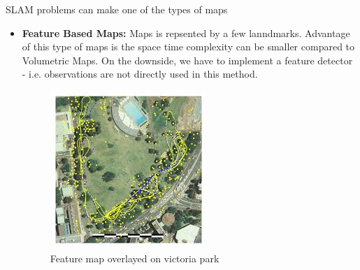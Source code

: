 \documentclass{article}
\begin{document}
SLAM problems can make one of the types of maps
\begin{itemize}
    \item \textbf{Feature Based Maps:} Maps is repsented by a few lanndmarks. Advantage of this type of maps is the space time complexity can be smaller compared to Volumetric Maps. On the downside, we have to implement a feature detector - i.e. observations are not directly used in this method. 
        \begin{figure}
            
            \includegraphics[width = \linewidth]{./feature_maps.jpeg}
            \caption{Feature map overlayed on victoria park}
        \end{figure}


\end{itemize}
\end{document}
